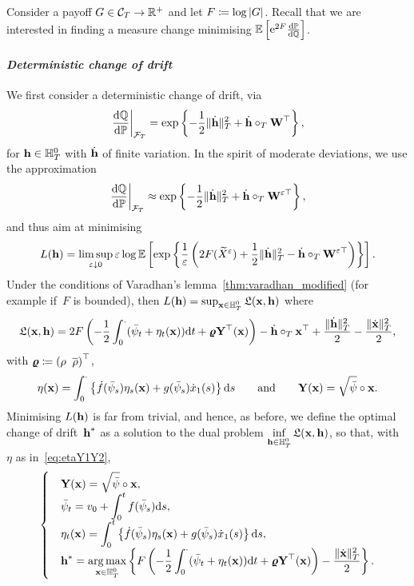 Consider a payoff $G\in\Cc_T\rightarrow\RR^{+}$ and let $F\defEqual\nobreak\log|G|$. 
Recall that we are interested in finding a measure change minimising $\EE\left[\E^{2F}\frac{\D\PP}{\D\QQ}\right]$.\\

\paragraph{\textit{Deterministic change of drift}}
We first consider a deterministic change of drift, via 
\[
\left.\frac{\D\QQ}{\D\PP}\right\vert_{\Ff_T} = \exp\left\{-\frac{1}{2}\|\dot{\hh}\|_{T}^2 + \dot{\hh}\cT \Wf^\top\right\},
\]
for $\hh \in \HH_T^0$ with $\dot{\hh}$ of finite variation. 
In the spirit of moderate deviations, we use the approximation 
\[
\left.\frac{\D\QQ}{\D\PP}\right\vert_{\Ff_T} \approx \exp\left\{-\frac{1}{2}\|\dot{\hh}\|_{T}^2 + \dot{\hh}\cT \Wf^{\eps\top}\right\},
\]
and thus aim at minimising
\[
L(\hh) = \limsup\limits_{\eps \downarrow 0} \eps\log\EE\left[\exp\left\{\frac{1}{\eps}\left(
2F(\widetilde{X}^\eps) + \frac{1}{2}\|\dot{\hh}\|_{T}^2 - \dot{\hh}\cT \Wf^{\eps\top}\right)\right\}\right].
\]
Under the conditions of Varadhan's lemma~\ref{thm:varadhan_modified} 
(for example if~$F$ is bounded), then
$L(\hh) =\nobreak \sup_{\xx \in \HH_T^0} \Lf(\xx,\hh)$ where
$$
\Lf(\xx,\hh)
 = 2 F\left(-\frac{1}{2}\int_0^.(\bar\psi_t + \eta_t(\xx))\D t + \vrho\Yf^\top(\xx) \right) - \dot{\hh}\cT\xx^\top + \frac{\|\dot{\hh}\|_{T}^2}{2} - \frac{\|\dot{\xx}\|_{T}^2}{2},
 $$
with $\vrho \defEqual \left(\rho \;\; \brho\right)^\top$,
\begin{equation}\label{eq:etaY1Y2}
\eta(\xx) = \int_0^\cdot\left\{\dot{f}(\bar\psi_s)\eta_s(\xx) + g(\bar\psi_s)\dot{x}_1(s)\right\}\D s
\qquad\text{and}\qquad
\Yf(\xx) = \sqrt{\bar\psi}\circ \xx.
\end{equation}
Minimising $L(\hh)$ is far from trivial, 
and hence, as before, we define the optimal change of drift~$\hh^{*}$ as a solution to the dual problem
$\inf\limits_{\hh \in \HH_T^0}\Lf(\xx,\hh)$,
so that, with~$\eta$ as in~\eqref{eq:etaY1Y2},
\begin{equation}\label{eq:optidetdrift}
\begin{cases}
&\displaystyle \Yf(\xx) = \sqrt{\bar\psi}\circ \xx, \\
&\displaystyle \bar\psi_t = v_0 + \int_0^t f(\bar\psi_s)\D s, \\
&\displaystyle \eta_t(\xx) = \int_0^t\left\{\dot{f}(\bar\psi_s)\eta_s(\xx) + g(\bar\psi_s)\dot{x}_1(s)\right\}\D s, \\
&\displaystyle \hh^{*} = \argmax\limits_{\xx \in \HH_T^0} \left\{F\left(-\frac{1}{2}\int_0^\cdot(\bar\psi_t + \eta_t(\xx))\D t + \vrho\Yf^\top(\xx)\right)- \frac{\|\dot{\xx}\|_{T}^2}{2}\right\}.
\end{cases}
\end{equation}

